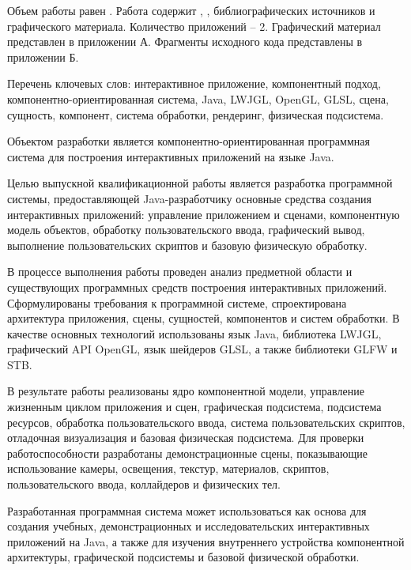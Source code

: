
Объем работы равен . Работа содержит , ,  библиографических источников и  графического материала. Количество приложений – 2. Графический материал представлен в приложении А. Фрагменты исходного кода представлены в приложении Б.

Перечень ключевых слов: интерактивное приложение, компонентный подход, компонентно-ориентированная система, Java, LWJGL, OpenGL, GLSL, сцена, сущность, компонент, система обработки, рендеринг, физическая подсистема.

Объектом разработки является компонентно-ориентированная программная система для построения интерактивных приложений на языке Java.

Целью выпускной квалификационной работы является разработка программной системы, предоставляющей Java-разработчику основные средства создания интерактивных приложений: управление приложением и сценами, компонентную модель объектов, обработку пользовательского ввода, графический вывод, выполнение пользовательских скриптов и базовую физическую обработку.

В процессе выполнения работы проведен анализ предметной области и существующих программных средств построения интерактивных приложений. Сформулированы требования к программной системе, спроектирована архитектура приложения, сцены, сущностей, компонентов и систем обработки. В качестве основных технологий использованы язык Java, библиотека LWJGL, графический API OpenGL, язык шейдеров GLSL, а также библиотеки GLFW и STB.

В результате работы реализованы ядро компонентной модели, управление жизненным циклом приложения и сцен, графическая подсистема, подсистема ресурсов, обработка пользовательского ввода, система пользовательских скриптов, отладочная визуализация и базовая физическая подсистема. Для проверки работоспособности разработаны демонстрационные сцены, показывающие использование камеры, освещения, текстур, материалов, скриптов, пользовательского ввода, коллайдеров и физических тел.

Разработанная программная система может использоваться как основа для создания учебных, демонстрационных и исследовательских интерактивных приложений на Java, а также для изучения внутреннего устройства компонентной архитектуры, графической подсистемы и базовой физической обработки.

